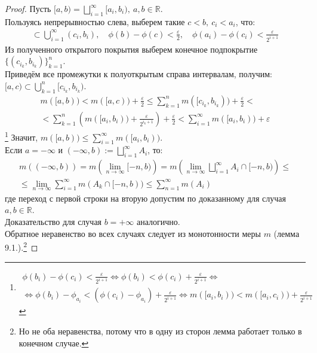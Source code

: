 \documentclass[11pt,a4paper]{report}
\def\eps{\varepsilon}
\def\Real{\mathbb{R}}
\theoremstyle{definition}
\theoremstyle{definition}
\theoremstyle{definition}
\begin{document}
	\begin{proof}
		Пусть $ [a, b) = \bigsqcup\limits_{i=1}^{\infty}{[a_{i}, b_{i})},\ a, b \in \Real $.\\
		Пользуясь непрерывностью слева, выберем такие $ c < b,\  c_{i} < a_{i} $, что: 
		\begin{gather*} 
			[a, c] \subset \bigcup\limits_{i=1}^{\infty}{(c_{i}, b_{i})},\quad \phi(b)-\phi(c) < \frac{\eps}{2},\quad \phi(a_{i}) - \phi(c_{i}) < \frac{\eps}{2^{i+1}}
		\end{gather*}
		Из полученного открытого покрытия выберем конечное подпокрытие $ \{ (c_{i_{k}}, b_{i_{k}})\}_{k=1}^{n} $.\\
		Приведём все промежутки к полуоткрытым справа интервалам, получим: $ [a, c) \subset \bigcup_{k=1}^{n}{ [c_{i_{k}}, b_{i_{k}} )} $.\\
		\begin{gather*}
		 m([a, b)) < m([a, c)) + \frac{\eps}{2} \le \sum\limits_{k=1}^{n}{m([c_{i_{k}}, b_{i_{k}})}) + \frac{\eps}{2} <\\< \sum_{k=1}^{n}{\left (m([a_{i}, b_{i})) + \frac{\eps}{2^{i_{k}+1}}\right )} + \frac{\eps}{2} 
		 < \sum_{i=1}^{\infty}{m([a_{i}, b_{i}))} + \eps
		\end{gather*}\footnote{
			\begin{gather*} 
				\phi(b_{i}) - \phi(c_{i}) < \frac{\eps}{2^{i+1}} \Leftrightarrow \phi(b_{i}) < \phi(c_{i}) + \frac{\eps}{2^{i+1}}\Leftrightarrow\\\Leftrightarrow \phi(b_{i}) - \phi_{a_{i}} < (\phi(c_{i}) - \phi_{a_{i}}) + \frac{\eps}{2^{i+1}} \Leftrightarrow m([a_{i}, b_{i})) < m([a_{i}, c_{i})) + \frac{\eps}{2^{i+1}} 
			\end{gather*}
		}
		Значит, $ m([a, b)) \le \sum_{i=1}^{\infty}{m([a_{i}, b_{i}))} $.\\
		Если $ a = -\infty $ и $ (-\infty, b) := \bigsqcup\limits_{i=1}^{\infty}{A_{i}} $, то:
		\begin{gather*} 
			m((-\infty, b)) = m\left (\lim\limits_{n\to\infty}{[-n, b)}\right ) = m\left (\lim\limits_{n\to\infty}{\bigsqcup\limits_{i=1}^{\infty} A_{i} \cap [-n, b)}\right ) \le\\
			\le  \lim\limits_{n\to\infty}{\sum\limits_{i=1}^{\infty}m(A_{k} \cap [-n, b))} \le \sum\limits_{n=1}^{\infty}m(A_{i})
		\end{gather*}
		где переход с первой строки на вторую допустим по доказанному для случая $ a, b \in \Real $.\\
		Доказательство для случая $ b = +\infty $ аналогично.\\
		Обратное неравенство во всех случаях следует из монотонности меры $ m $ (лемма 9.1.).\footnote{Но не оба неравенства, потому что в одну из сторон лемма работает только в конечном случае.}
	\end{proof}
\end{document}
